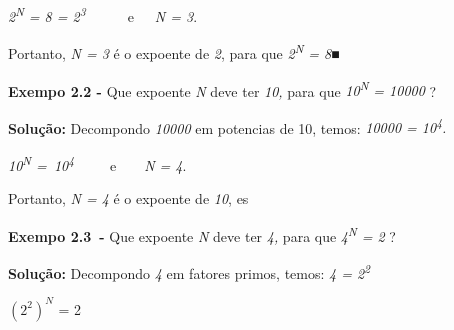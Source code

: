 \documentclass[12pt]{article}
\begin{document}
\begin{enumerate}[label*={\fontsize{14pt}{14pt}\selectfont \textbf{\arabic*.}}]
\begin{justify}
\textit{2\textsuperscript{N} = 8 = 2\textsuperscript{3}}\ \ \ \ \ \ e\ \ \   \textit{N = 3}.
\end{justify}\par

\begin{justify}
Portanto, \textit{N = 3} é o expoente de \textit{2}, para que \textit{2\textsuperscript{N} = 8}■
\end{justify}\par


\vspace{\baselineskip}
\begin{justify}
\textbf{Exempo 2.2 - }  Que expoente \textit{N} deve ter \textit{10,} para que \textit{10\textsuperscript{N} = 10000 } ? 
\end{justify}\par

\begin{justify}
\textbf{Solução:} Decompondo \textit{10000} em potencias de 10, temos: \textit{10000 = 10\textsuperscript{4}.} 
\end{justify}\par

\begin{justify}
\textit{10\textsuperscript{N} =\  10\textsuperscript{4}\ \ \ \ \  }e\ \ \ \  \textit{N = 4}.
\end{justify}\par

\begin{justify}
Portanto, \textit{N = 4} é o expoente de \textit{10}, es
\end{justify}\par

\begin{justify}
\textbf{Exempo 2.3\  -} Que expoente \textit{N} deve ter \textit{4,} para que \textit{4\textsuperscript{N} = 2 } ? 
\end{justify}\par

\begin{justify}
\textbf{Solução:} Decompondo \textit{4} em fatores primos, temos: \textit{4 = 2\textsuperscript{2}} 
\end{justify}\par

\begin{justify}
 \(  \left( 2^{2} \right) ^{N} \) = 2\ \ \  
\end{justify}\par


\end{enumerate}
\end{document}
